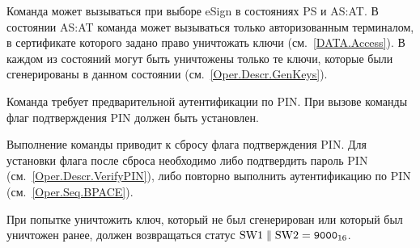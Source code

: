 Команда может вызываться при выборе eSign в состояниях 
PS и AS:AT. В состоянии AS:AT команда может вызываться только
авторизованным терминалом, в сертификате которого задано право
уничтожать ключи (см.~\ref{DATA.Access}).
В каждом из состояний могут быть уничтожены только те ключи, которые
были сгенерированы в данном состоянии (см.~\ref{Oper.Descr.GenKeys}).

Команда требует предварительной аутентификации по PIN. 
При вызове команды флаг подтверждения PIN должен быть установлен.

Выполнение команды приводит к сбросу флага подтверждения PIN.
Для установки флага после сброса необходимо либо подтвердить пароль PIN 
(см.~\ref{Oper.Descr.VerifyPIN}), либо повторно выполнить аутентификацию по PIN 
(см.~\ref{Oper.Seq.BPACE}). 

При попытке уничтожить ключ, который не был сгенерирован
или который был уничтожен ранее, должен возвращаться 
статус $\text{SW1} \parallel \text{SW2} = \texttt{9000}_{16}$.